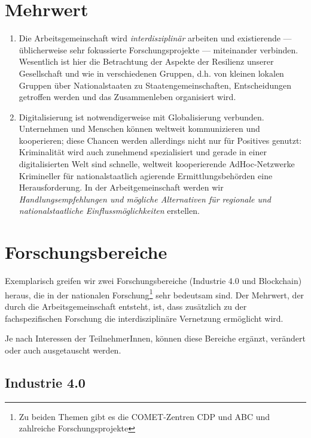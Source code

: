 \documentclass[11pt]{scrartcl}
\begin{document}
\section{Mehrwert}\label{section:mehrwert}
\begin{enumerate}
\item   Die Arbeitsgemeinschaft wird \emph{interdisziplinär} arbeiten und existierende --- üblicherweise sehr fokussierte Forschungsprojekte --- miteinander verbinden. Wesentlich ist hier die Betrachtung der Aspekte der Resilienz unserer Gesellschaft und wie in verschiedenen Gruppen, d.h. von kleinen lokalen Gruppen über Nationalstaaten zu Staatengemeinschaften, Entscheidungen getroffen werden und das Zusammenleben organisiert wird.

\item   Digitalisierung ist notwendigerweise mit Globalisierung verbunden. Unternehmen und Menschen können weltweit kommunizieren und kooperieren; diese Chancen werden allerdings nicht nur für Positives genutzt: Kriminalität wird auch zunehmend spezialisiert und gerade in einer digitalisierten Welt sind schnelle, weltweit kooperierende AdHoc-Netzwerke Krimineller für nationalstaatlich agierende Ermittlungsbehörden eine Herausforderung. In der Arbeitgemeinschaft werden wir \emph{Handlungsempfehlungen und mögliche Alternativen für regionale und nationalstaatliche Einflussmöglichkeiten} erstellen.

\end{enumerate}

\section{Forschungsbereiche}

Exemplarisch greifen wir zwei Forschungsbereiche (Industrie 4.0 und Blockchain) heraus, die in der nationalen Forschung\footnote{Zu beiden Themen gibt es die COMET-Zentren CDP und ABC und zahlreiche Forschungsprojekte} sehr bedeutsam sind. Der Mehrwert, der durch die Arbeitsgemeinschaft entsteht, ist, dass  zusätzlich zu der fachspezifischen Forschung die interdisziplinäre Vernetzung ermöglicht wird. 

Je nach Interessen der TeilnehmerInnen, können diese Bereiche ergänzt, verändert oder auch ausgetauscht werden. 

\subsection{Industrie 4.0}
\end{document}
